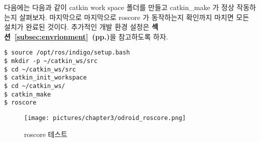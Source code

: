 다음에는 다음과 같이 catkin work space 폴더를 만들고 catkin\_make 가 정상 작동하는지 살펴보자. 마지막으로 마지막으로 roscore 가 동작하는지 확인까지 마치면 모든 설치가 완료된 것이다. 추가적인 개발 환경 설정은 \textbf{섹션~\ref{subsec:envrionment}~(pp.\pageref{subsec:envrionment})}을 참고하도록 하자.

\vspace{\baselineskip}
\begin{lstlisting}[language=ROS]
$ source /opt/ros/indigo/setup.bash
$ mkdir -p ~/catkin_ws/src
$ cd ~/catkin_ws/src
$ catkin_init_workspace
$ cd ~/catkin_ws/
$ catkin_make
$ roscore
\end{lstlisting}

\begin{figure}[h]
\centering
\texttt{[image: pictures/chapter3/odroid\_roscore.png]}
\caption{roscore 테스트}
\end{figure}



































































